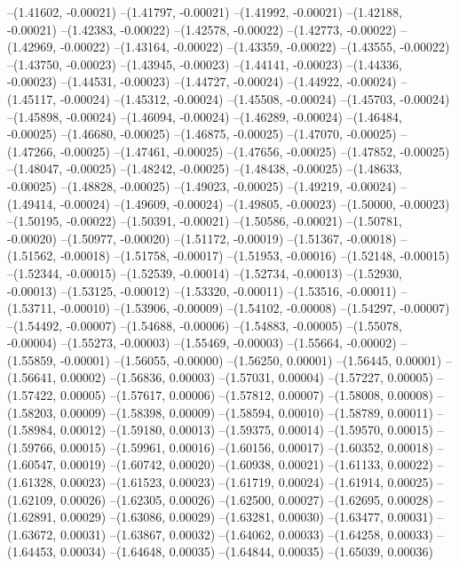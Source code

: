 --(1.41602, -0.00021)
--(1.41797, -0.00021)
--(1.41992, -0.00021)
--(1.42188, -0.00021)
--(1.42383, -0.00022)
--(1.42578, -0.00022)
--(1.42773, -0.00022)
--(1.42969, -0.00022)
--(1.43164, -0.00022)
--(1.43359, -0.00022)
--(1.43555, -0.00022)
--(1.43750, -0.00023)
--(1.43945, -0.00023)
--(1.44141, -0.00023)
--(1.44336, -0.00023)
--(1.44531, -0.00023)
--(1.44727, -0.00024)
--(1.44922, -0.00024)
--(1.45117, -0.00024)
--(1.45312, -0.00024)
--(1.45508, -0.00024)
--(1.45703, -0.00024)
--(1.45898, -0.00024)
--(1.46094, -0.00024)
--(1.46289, -0.00024)
--(1.46484, -0.00025)
--(1.46680, -0.00025)
--(1.46875, -0.00025)
--(1.47070, -0.00025)
--(1.47266, -0.00025)
--(1.47461, -0.00025)
--(1.47656, -0.00025)
--(1.47852, -0.00025)
--(1.48047, -0.00025)
--(1.48242, -0.00025)
--(1.48438, -0.00025)
--(1.48633, -0.00025)
--(1.48828, -0.00025)
--(1.49023, -0.00025)
--(1.49219, -0.00024)
--(1.49414, -0.00024)
--(1.49609, -0.00024)
--(1.49805, -0.00023)
--(1.50000, -0.00023)
--(1.50195, -0.00022)
--(1.50391, -0.00021)
--(1.50586, -0.00021)
--(1.50781, -0.00020)
--(1.50977, -0.00020)
--(1.51172, -0.00019)
--(1.51367, -0.00018)
--(1.51562, -0.00018)
--(1.51758, -0.00017)
--(1.51953, -0.00016)
--(1.52148, -0.00015)
--(1.52344, -0.00015)
--(1.52539, -0.00014)
--(1.52734, -0.00013)
--(1.52930, -0.00013)
--(1.53125, -0.00012)
--(1.53320, -0.00011)
--(1.53516, -0.00011)
--(1.53711, -0.00010)
--(1.53906, -0.00009)
--(1.54102, -0.00008)
--(1.54297, -0.00007)
--(1.54492, -0.00007)
--(1.54688, -0.00006)
--(1.54883, -0.00005)
--(1.55078, -0.00004)
--(1.55273, -0.00003)
--(1.55469, -0.00003)
--(1.55664, -0.00002)
--(1.55859, -0.00001)
--(1.56055, -0.00000)
--(1.56250, 0.00001)
--(1.56445, 0.00001)
--(1.56641, 0.00002)
--(1.56836, 0.00003)
--(1.57031, 0.00004)
--(1.57227, 0.00005)
--(1.57422, 0.00005)
--(1.57617, 0.00006)
--(1.57812, 0.00007)
--(1.58008, 0.00008)
--(1.58203, 0.00009)
--(1.58398, 0.00009)
--(1.58594, 0.00010)
--(1.58789, 0.00011)
--(1.58984, 0.00012)
--(1.59180, 0.00013)
--(1.59375, 0.00014)
--(1.59570, 0.00015)
--(1.59766, 0.00015)
--(1.59961, 0.00016)
--(1.60156, 0.00017)
--(1.60352, 0.00018)
--(1.60547, 0.00019)
--(1.60742, 0.00020)
--(1.60938, 0.00021)
--(1.61133, 0.00022)
--(1.61328, 0.00023)
--(1.61523, 0.00023)
--(1.61719, 0.00024)
--(1.61914, 0.00025)
--(1.62109, 0.00026)
--(1.62305, 0.00026)
--(1.62500, 0.00027)
--(1.62695, 0.00028)
--(1.62891, 0.00029)
--(1.63086, 0.00029)
--(1.63281, 0.00030)
--(1.63477, 0.00031)
--(1.63672, 0.00031)
--(1.63867, 0.00032)
--(1.64062, 0.00033)
--(1.64258, 0.00033)
--(1.64453, 0.00034)
--(1.64648, 0.00035)
--(1.64844, 0.00035)
--(1.65039, 0.00036)
